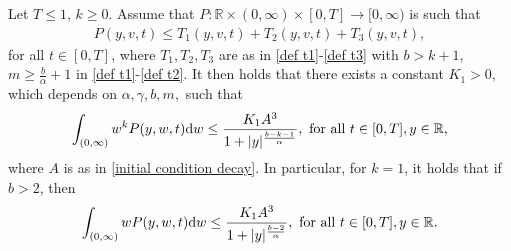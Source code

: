 \documentclass[11pt]{article}
\numberwithin{equation}{section}
\newcommand{\der}{\textup{d}}
\begin{document}
\begin{prop}\label{moment estimates prop}
Let $T\leq 1$, $k\geq 0$. Assume that $P:\mathbb{R}\times (0,\infty)\times [0,T]\rightarrow [0,\infty)$ is such that
\begin{align*}
 P(y,v,t)\leq T_{1}(y,v,t)+T_{2}(y,v,t)+T_{3}(y,v,t),
    \end{align*}
 for all $t\in[0,T]$,  where $T_{1},T_{2},T_{3}$ are as in \eqref{def t1}-\eqref{def t3} with $b>k+1$, $m\geq \frac{b}{\alpha}+1$ in \eqref{def t1}-\eqref{def t2}. It then holds that there exists a constant $K_{1}>0$, which depends on $\alpha,\gamma,b,m,$ such that
\begin{align}\label{desired moment estimate}
    \int_{(0,\infty)}w^{k}P(y,w,t)\der w\leq \frac{K_{1}A^{3}}{1+|y|^{\frac{b-k-1}{\alpha}}}, \textup{ for all } t\in[0,T], y\in\mathbb{R},
\end{align}
where $A$ is as in \eqref{initial condition decay}. In particular, for $k=1$, it holds that if $b>2$, then
\begin{align}
    \int_{(0,\infty)}wP(y,w,t)\der w\leq \frac{K_{1}A^{3}}{1+|y|^{\frac{b-2}{\alpha}}}, \textup{ for all } t\in[0,T], y\in\mathbb{R}.
\end{align}
\end{prop}
\end{document}
